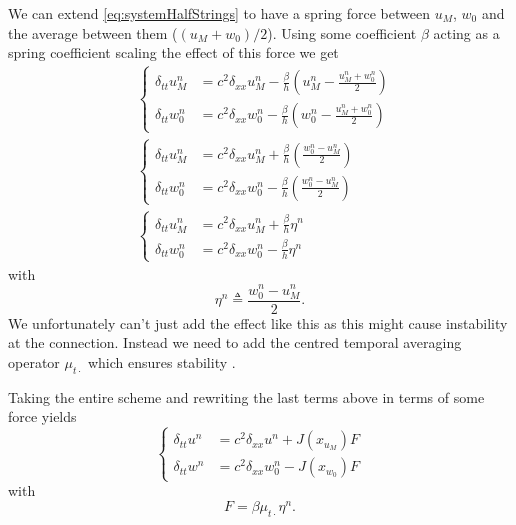 \documentclass[dvipsnames]{article}
\begin{document}
We can extend \eqref{eq:systemHalfStrings} to have a spring force between $u_M$, $w_0$ and the average between them ($(u_M + w_0) / 2$). Using some coefficient $\beta$ acting as a spring coefficient scaling the effect of this force we get
\begin{align}
    &\begin{cases}\nonumber
        \delta_{tt}u_M^n &= c^2\delta_{xx}u_M^n - \frac{\beta}{h} \left(u_M^n - \frac{u_M^n + w_0^n}{2}\right)\\
        \delta_{tt}w_0^n &= c^2\delta_{xx}w_0^n - \frac{\beta}{h} \left(w_0^n - \frac{u_M^n + w_0^n}{2}\right)
    \end{cases}\\
    &\begin{cases}\nonumber
        \delta_{tt}u_M^n &= c^2\delta_{xx}u_M^n + \frac{\beta}{h} \left(\frac{w_0^n - u_M^n}{2}\right)\\
        \delta_{tt}w_0^n &= c^2\delta_{xx}w_0^n - \frac{\beta}{h}\left( \frac{w_0^n - u_M^n}{2}\right)
    \end{cases}
    \\
    &\begin{cases}\nonumber
        \delta_{tt}u_M^n &= c^2\delta_{xx}u_M^n + \frac{\beta}{h} \eta^n\\
        \delta_{tt}w_0^n &= c^2\delta_{xx}w_0^n - \frac{\beta}{h}\eta^n
    \end{cases}
\end{align}
with
\begin{equation}\label{eq:etaCorrDef}
    \eta^n \triangleq \frac{w_0^n - u_M^n}{2}.
\end{equation}
We unfortunately can't just add the effect like this as this might cause instability at the connection. Instead we need to add the centred temporal averaging operator $\mu_{t\cdot}$ which ensures stability \cite{Bilbao2009}.

Taking the entire scheme and rewriting the last terms above in terms of some force yields
\begin{equation}\label{eq:dispCorrSyst}
    \begin{cases}
        \delta_{tt}u^n &= c^2\delta_{xx}u^n + J(x_{u_M})F\\
        \delta_{tt}w^n &= c^2\delta_{xx}w_0^n - J(x_{w_0})F
    \end{cases}
\end{equation}
with
\begin{equation}\label{eq:corrForceNoDamp}
    F = \beta \mu_{t\cdot}\eta^n.
\end{equation}
\end{document}
